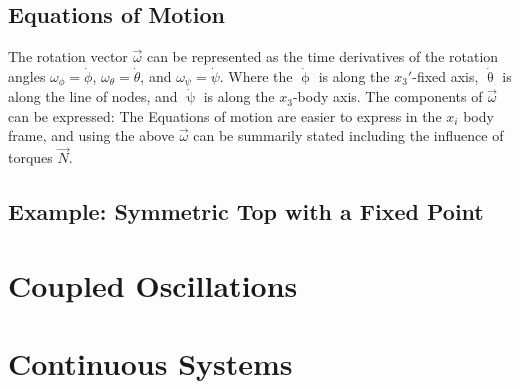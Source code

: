 \subsection{Equations of Motion}
The rotation vector $\vec{\omega}$ can be represented as the time derivatives of the rotation angles $\omega_{\phi} = \dot{\phi}$, $\omega_{\theta} = \dot{\theta}$, and $\omega_{\psi} = \dot{\psi}$. Where the $\dot{\upphi}$ is along the $x_3'$-fixed axis, $\dot{\uptheta}$ is along the line of nodes, and $\dot{\uppsi}$ is along the $x_3$-body axis. The components of $\vec{\omega}$ can be expressed:
The Equations of motion are easier to express in the $x_i$ body frame, and using the above $\vec{\omega}$ can be summarily stated including the influence of torques $\vec{N}$.

\subsection{Example: Symmetric Top with a Fixed Point}



\newpage
\section{Coupled Oscillations}
\label{sec:cm-coupled}

 


\newpage
\section{Continuous Systems}
\label{sec:cm-continuous}




